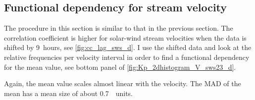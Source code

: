 \subsection{Functional dependency for stream velocity}
The procedure in this section is similar to that in the previous section. The correlation coefficient is higher for solar-wind stream velocities when the data is shifted by 9~hours, see \autoref{fig:cc_lag_sws_d}.
I use the shifted data and look at the relative frequencies per velocity interval in order to find a functional dependency for the mean \Kp{} value, see bottom panel of \autoref{fig:Kp_2dhistogram_V_sws23_d}.
\begin{figure}
\end{figure}
Again, the mean \Kp{} value scales almost linear with the velocity. The MAD of the mean has a mean size of about \SI{0.7}{\Kp~units}.

